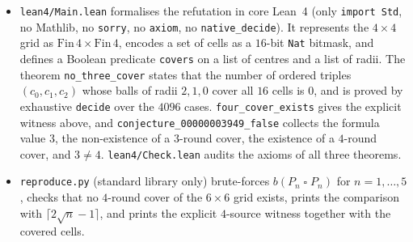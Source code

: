 \documentclass[11pt]{article}
\theoremstyle{definition}
\theoremstyle{remark}
\begin{document}
\begin{itemize}
  \item \texttt{lean4/Main.lean} formalises the refutation in core Lean~4
        (only \texttt{import Std}, no Mathlib, no \texttt{sorry}, no
        \texttt{axiom}, no \texttt{native\_decide}).  It represents the $4\times4$
        grid as $\mathrm{Fin}\,4 \times \mathrm{Fin}\,4$, encodes a set of cells
        as a $16$-bit \texttt{Nat} bitmask, and defines a Boolean predicate
        \texttt{covers} on a list of centres and a list of radii.  The theorem
        \texttt{no\_three\_cover} states that the number of ordered triples
        $(c_0,c_1,c_2)$ whose balls of radii $2,1,0$ cover all $16$ cells is
        $0$, and is proved by exhaustive \texttt{decide} over the $4096$ cases.
        \texttt{four\_cover\_exists} gives the explicit witness above, and
        \texttt{conjecture\_00000003949\_false} collects the formula value $3$,
        the non-existence of a $3$-round cover, the existence of a $4$-round
        cover, and $3 \neq 4$.  \texttt{lean4/Check.lean} audits the axioms of
        all three theorems.
  \item \texttt{reproduce.py} (standard library only) brute-forces
        $b(P_n \mathbin{\square} P_n)$ for $n=1,\dots,5$, checks that no
        $4$-round cover of the $6\times6$ grid exists, prints the comparison
        with $\lceil 2\sqrt{n}-1\rceil$, and prints the explicit $4$-source
        witness together with the covered cells.
\end{itemize}
\end{document}
